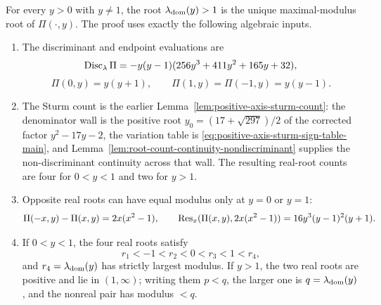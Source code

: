 \begin{proposition}\label{lem:positive-axis-dominance-criterion}\label{prop:positive-axis-dominance-package}
For every $y>0$ with $y\ne1$, the root $\lambda_{\rm dom}(y)>1$ is the unique maximal-modulus root of $\Pi(\cdot,y)$.  The proof uses exactly the following algebraic inputs.
\begin{enumerate}
\item The discriminant and endpoint evaluations are
\begin{equation}\label{eq:positive-axis-discriminant}
\operatorname{Disc}_\lambda\Pi=-y(y-1)(256y^3+411y^2+165y+32),
\end{equation}
\begin{equation}\label{eq:positive-axis-resultants}
\Pi(0,y)=y(y+1),\qquad \Pi(1,y)=\Pi(-1,y)=y(y-1).
\end{equation}
\item The Sturm count is the earlier Lemma~\ref{lem:positive-axis-sturm-count}: the denominator wall is the positive root \(y_0=(17+\sqrt{297})/2\) of the corrected factor \(y^2-17y-2\), the variation table is \eqref{eq:positive-axis-sturm-sign-table-main}, and Lemma~\ref{lem:root-count-continuity-nondiscriminant} supplies the non-discriminant continuity across that wall.  The resulting real-root counts are four for \(0<y<1\) and two for \(y>1\).
\item Opposite real roots can have equal modulus only at $y=0$ or $y=1$:
\begin{equation}\label{eq:opposite-modulus-resultant}
\Pi(-x,y)-\Pi(x,y)=2x(x^2-1),\qquad
\operatorname{Res}_x(\Pi(x,y),2x(x^2-1))=16y^3(y-1)^2(y+1).
\end{equation}
\item If $0<y<1$, the four real roots satisfy
\begin{equation}\label{eq:positive-axis-root-boxes}
r_1<-1<r_2<0<r_3<1<r_4,
\end{equation}
and $r_4=\lambda_{\rm dom}(y)$ has strictly largest modulus.  If $y>1$, the two real roots are positive and lie in $(1,\infty)$; writing them $p<q$, the larger one is $q=\lambda_{\rm dom}(y)$, and the nonreal pair has modulus $<q$.
\end{enumerate}
\end{proposition}
